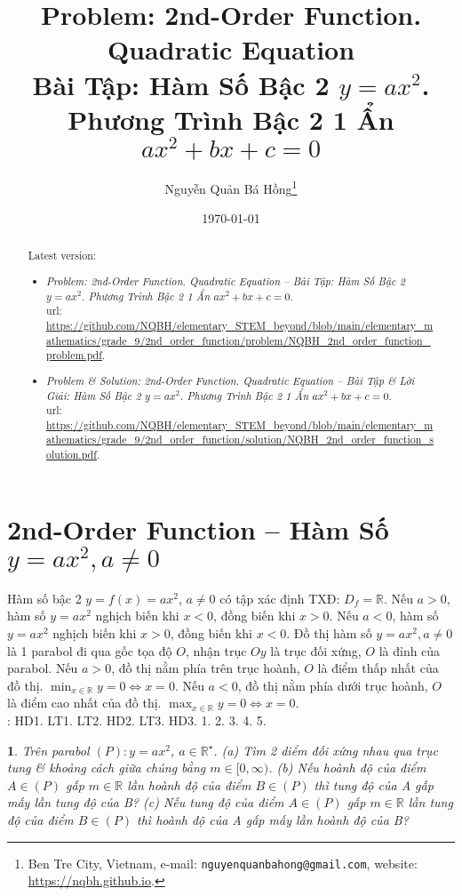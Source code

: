 \documentclass{article}
\title{Problem: 2nd-Order Function. Quadratic Equation\\Bài Tập: Hàm Số Bậc 2 $y = ax^2$. Phương Trình Bậc 2 1 Ẩn $ax^2 + bx + c = 0$}
\author{Nguyễn Quản Bá Hồng\footnote{Ben Tre City, Vietnam, e-mail: \texttt{nguyenquanbahong@gmail.com}, website: \url{https://nqbh.github.io}.}}
\date{\today}
\newtheorem{baitoan}{}
\begin{document}
\maketitle
\begin{abstract}
	Latest version:
	\begin{itemize}
		\item \textit{Problem: 2nd-Order Function. Quadratic Equation -- Bài Tập: Hàm Số Bậc 2 $y = ax^2$. Phương Trình Bậc 2 1 Ẩn $ax^2 + bx + c = 0$}.\\{\sc url}: \url{https://github.com/NQBH/elementary_STEM_beyond/blob/main/elementary_mathematics/grade_9/2nd_order_function/problem/NQBH_2nd_order_function_problem.pdf}.
		\item \textit{Problem \& Solution: 2nd-Order Function. Quadratic Equation -- Bài Tập \& Lời Giải: Hàm Số Bậc 2 $y = ax^2$. Phương Trình Bậc 2 1 Ẩn $ax^2 + bx + c = 0$}.\\{\sc url}: \url{https://github.com/NQBH/elementary_STEM_beyond/blob/main/elementary_mathematics/grade_9/2nd_order_function/solution/NQBH_2nd_order_function_solution.pdf}.
	\end{itemize}
\end{abstract}
\tableofcontents


\section{2nd-Order Function -- Hàm Số $y = ax^2,a\ne0$}
 Hàm số bậc 2 $y = f(x) = ax^2$, $a\ne0$ có tập xác định TXĐ: $D_f = \mathbb{R}$. Nếu $a > 0$, hàm số $y = ax^2$ nghịch biến khi $x < 0$, đồng biến khi $x > 0$. Nếu $a < 0$, hàm số $y = ax^2$ nghịch biến khi $x > 0$, đồng biến khi $x < 0$.  Đồ thị hàm số $y = ax^2,a\ne0$ là 1 parabol đi qua gốc tọa độ $O$, nhận trục $Oy$ là trục đối xứng, $O$ là đỉnh của parabol. Nếu $a > 0$, đồ thị nằm phía trên trục hoành, $O$ là điểm thấp nhất của đồ thị. $\min_{x\in\mathbb{R}} y = 0\Leftrightarrow x = 0$. Nếu $a < 0$, đồ thị nằm phía dưới trục hoành, $O$ là điểm cao nhất của đồ thị. $\max_{x\in\mathbb{R}} y = 0\Leftrightarrow x = 0$.\\

\noindent\cite[Chap. VII, \S1, pp. 46--51]{SGK_Toan_9_Canh_Dieu_tap_2}: HD1. LT1. LT2. HD2. LT3. HD3. 1. 2. 3. 4. 5.

\begin{baitoan}
	Trên parabol $(P):y = ax^2$, $a\in\mathbb{R}^\star$. (a) Tìm 2 diểm đối xứng nhau qua trục tung \& khoảng cách giữa chúng bằng $m\in[0,\infty)$. (b) Nếu hoành độ của điểm $A\in(P)$ gấp $m\in\mathbb{R}$ lần hoành độ của điểm $B\in(P)$ thì tung độ của A gấp mấy lần tung độ của B? (c) Nếu tung độ của điểm $A\in(P)$ gấp $m\in\mathbb{R}$ lần tung độ của điểm $B\in(P)$ thì hoành độ của A gấp mấy lần hoành độ của B?
\end{baitoan}
\end{document}
